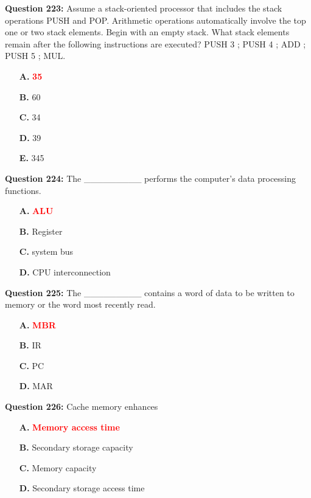 \documentclass[12pt,a4paper]{article}
\begin{document}
\vspace{0.5cm}

\textbf{Question 223:} Assume a stack-oriented processor that includes the stack operations PUSH and POP. Arithmetic operations automatically involve the top one or two stack elements. Begin with an empty stack. What stack elements remain after the following instructions are executed? PUSH 3 ; PUSH 4 ; ADD ; PUSH 5 ; MUL.

\begin{itemize}
    \item[\textbf{A.}] \textcolor{red}{\textbf{35}}
    \item[\textbf{B.}] 60
    \item[\textbf{C.}] 34
    \item[\textbf{D.}] 39
    \item[\textbf{E.}] 345
\end{itemize}

\vspace{0.5cm}

\textbf{Question 224:} The _________ performs the computer's data processing functions.

\begin{itemize}
    \item[\textbf{A.}] \textcolor{red}{\textbf{ALU}}
    \item[\textbf{B.}] Register
    \item[\textbf{C.}] system bus
    \item[\textbf{D.}] CPU interconnection
\end{itemize}

\vspace{0.5cm}

\textbf{Question 225:} The _________ contains a word of data to be written to memory or the word most recently read.

\begin{itemize}
    \item[\textbf{A.}] \textcolor{red}{\textbf{MBR}}
    \item[\textbf{B.}] IR
    \item[\textbf{C.}] PC
    \item[\textbf{D.}] MAR
\end{itemize}

\vspace{0.5cm}

\textbf{Question 226:} Cache memory enhances

\begin{itemize}
    \item[\textbf{A.}] \textcolor{red}{\textbf{Memory access time}}
    \item[\textbf{B.}] Secondary storage capacity
    \item[\textbf{C.}] Memory capacity
    \item[\textbf{D.}] Secondary storage access time
\end{itemize}
\end{document}
